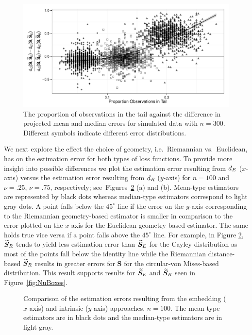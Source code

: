 \begin{figure}[h!]
\centering
\includegraphics[width=.8\textwidth]{Nu75N300TailBehaviorStandard}
\caption{The proportion of observations in the tail against the difference in projected mean and median errors for simulated data with $n=300$.  Different symbols indicate different error distributions.}
\label{fig:SimTail}
\end{figure}

We next explore the effect the choice of geometry, i.e.~Riemannian vs.~Euclidean, has on the estimation error for both types of loss functions. To provide more insight into possible differences we plot the estimation error resulting from ${d_E}$ ($x$-axis) versus the estimation error resulting from ${d_R}$ ($y$-axis) for $n=100$ and $\nu=.25$,  $\nu=.75$, respectively; see~Figures~\ref{fig:comPL2} (a) and (b).   
Mean-type estimators are represented by black dots whereas median-type estimators correspond to light gray dots. A point falls below the $45^\circ{}$ line if the error on the $y$-axis corresponding to the Riemannian geometry-based estimator is smaller in comparison to the error plotted on the $x$-axis for the Euclidean geometry-based estimator.  The same holds true vice versa if a point falls above the $45^\circ{}$ line. 
For example, in Figure \ref{fig:comPL2},  ${\widetilde{\bm S}_R}$ tends to yield less estimation error than ${\widetilde{\bm S}_E}$  for the Cayley distribution as most of the points fall below the identity line while the Riemannian distance-based ${\widetilde{\bm S}_R}$ results in greater errors for ${\bm S}$ for the circular-von Mises-based distribution.  This result supports results for ${\widetilde{\bm S}_E}$ and ${\widetilde{\bm S}_R}$ seen in Figure~\ref{fig:NuBoxes}.

\begin{figure}[h!]
\centering
{}\newline
{}
\caption{Comparison of the estimation errors resulting from the embedding ($x$-axis) and intrinsic ($y$-axis) approaches, $n=100$.  The mean-type estimators are in black dots and the median-type estimators are in light gray.}
\label{fig:comPL2}
\end{figure}

